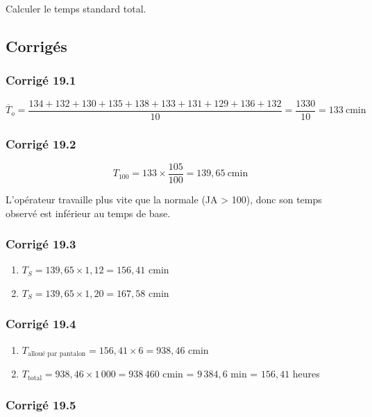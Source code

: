 \documentclass[a4paper,12pt]{article}
\begin{document}
Calculer le temps standard total.

\subsection{Corrigés}

\subsubsection*{Corrigé 19.1}

\[
\overline{T}_o = \frac{134+132+130+135+138+133+131+129+136+132}{10} = \frac{1330}{10} = 133\ \text{cmin}
\]

\subsubsection*{Corrigé 19.2}

\[
T_{100} = 133 \times \frac{105}{100} = 139,65\ \text{cmin}
\]

L'opérateur travaille plus vite que la normale (JA > 100), donc son temps observé est inférieur au temps de base.

\subsubsection*{Corrigé 19.3}

\begin{enumerate}
    \item $T_S = 139,65 \times 1,12 = 156,41$ cmin
    \item $T_S = 139,65 \times 1,20 = 167,58$ cmin
\end{enumerate}

\subsubsection*{Corrigé 19.4}

\begin{enumerate}
    \item $T_{\text{alloué par pantalon}} = 156,41 \times 6 = 938,46$ cmin
    \item $T_{\text{total}} = 938,46 \times 1\,000 = 938\,460$ cmin = $9\,384,6$ min = $156,41$ heures
\end{enumerate}

\subsubsection*{Corrigé 19.5}
\end{document}
